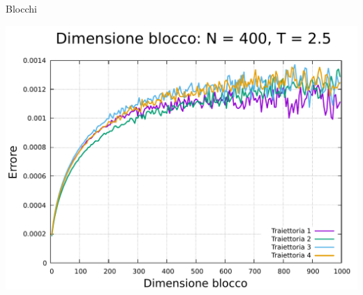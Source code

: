 \begin{frame}
\begin{columns}
\begin{column}{0.33\textwidth}
\begin{block}{Blocchi}
                \vspace{0.5cm}

                \centering
                \includegraphics[width=\textwidth]{Immagini/simIsing2D/err_400_2.5.pdf}

            \end{block}        
        \end{column}
    \end{columns}
\end{frame}



